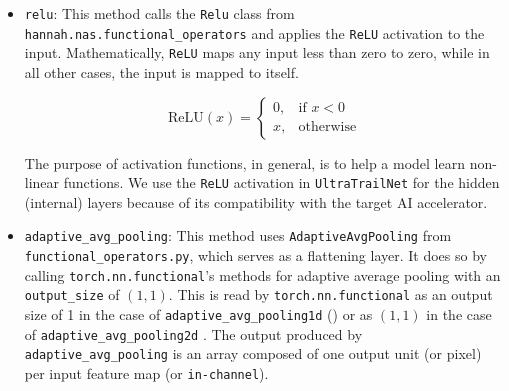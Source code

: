 \documentclass[11pt,a4paper, open=any]{scrbook}
\newcounter{constraint}[chapter]
\newcommand{\py}[1]{\texttt{#1}}
\begin{document}
\begin{itemize}[
	label={},
	parsep=0pt,
	partopsep=0pt,
	itemsep=16pt
	]
	\begin{verbatim}
		@scope
		def batch_norm(self, layer_input):
			# https://stackoverflow.com/questions/4488744/ 
			# pytorch-nn-functional-batch-norm-for-2d-input
			n_channels = layer_input.shape()[1]
			running_mu = Tensor(name='running_mean', 	shape=(n_channels,),
			axis=('C',))
			running_std = Tensor(name='running_std', 	shape=(n_channels,),
			axis=('C',))
			return BatchNorm()(layer_input, running_mu, running_std)
	\end{verbatim}
	
	
	This implementation is sufficient for the purposes of approximating the effects of batch normalisation during NAS. However, it does not adhere to the constraints imposed by the target AI architecture \cite[3-4]{bernardo20}. Implementing a hardware-compliant version would be complex and require introducing fairly significant modifications to HANNAH, yet would make minimal difference to the overall efficacy of NAS. We therefore arrived at the conclusion that it would be more efficient to forgo the implementation of a hardware-aware batch normalisation method within \py{UltraTrailNet} for the purposes of this thesis.
	
	\item \py{relu}: This method calls the \py{Relu} class from \py{hannah.nas.functional_operators} and applies the \texttt{ReLU} activation to the input. Mathematically, \texttt{ReLU} maps any input less than zero to zero, while in all other cases, the input is mapped to itself.
	
	\begin{equation}
		\text{ReLU}(x) = 
		\begin{cases}
			0, & \text{if } x < 0\\
			x, & \text{otherwise}
		\end{cases}
	\end{equation}
	
	The purpose of activation functions, in general, is to help a model learn non-linear functions. We use the \texttt{ReLU} activation in \py{UltraTrailNet} for the hidden (internal) layers because of its compatibility with the target AI accelerator.
	
	\item \py{adaptive_avg_pooling}: This method uses \py{AdaptiveAvgPooling} from \py{functional_operators.py}, which serves as a flattening layer. It does so by calling \py{torch.nn.functional}'s methods for adaptive average pooling with an \py{output_size} of $(1,1)$. This is read by \py{torch.nn.functional} as an output size of 1 in the case of \py{adaptive_avg_pooling1d} (\cite{torchAAP1d}) or as $(1,1)$  in the case of \py{adaptive_avg_pooling2d} \cite{torchAAP2d}. The output produced by \py{adaptive_avg_pooling} is an array composed of one output unit (or pixel) per input feature map (or \texttt{in-channel}).
	

\end{itemize}
\end{document}
